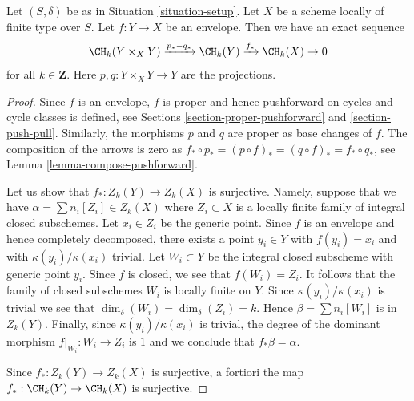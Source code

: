 %
\begin{lemma}
\label{lemma-envelope}
Let $(S, \delta)$ be as in Situation \ref{situation-setup}.
Let $X$ be a scheme locally of finite type over $S$.
Let $f : Y \to X$ be an envelope. Then
we have an exact sequence
$$
\CH_k(Y \times_X Y) \xrightarrow{p_* - q_*}
\CH_k(Y) \xrightarrow{f_*}
\CH_k(X) \to 0
$$
for all $k \in \mathbf{Z}$. Here $p, q : Y \times_X Y \to Y$ are
the projections.
\end{lemma}

\begin{proof}
Since $f$ is an envelope, $f$ is proper and hence pushforward on
cycles and cycle classes is defined, see
Sections \ref{section-proper-pushforward} and \ref{section-push-pull}.
Similarly, the morphisms $p$ and $q$ are proper as base changes of $f$.
The composition of the arrows is zero as
$f_* \circ p_* = (p \circ f)_* = (q \circ f)_* = f_* \circ q_*$, see
Lemma \ref{lemma-compose-pushforward}.

\medskip\noindent
Let us show that $f_* : Z_k(Y) \to Z_k(X)$ is surjective.
Namely, suppose that we have $\alpha = \sum n_i[Z_i] \in Z_k(X)$
where $Z_i \subset X$ is a locally finite family of integral
closed subschemes. Let $x_i \in Z_i$ be the generic point.
Since $f$ is an envelope and hence completely decomposed,
there exists a point $y_i \in Y$ with $f(y_i) = x_i$
and with $\kappa(y_i)/\kappa(x_i)$ trivial. Let $W_i \subset Y$
be the integral closed subscheme with generic point $y_i$.
Since $f$ is closed, we see that $f(W_i) = Z_i$.
It follows that the family of closed subschemes $W_i$ is locally finite
on $Y$. Since $\kappa(y_i)/\kappa(x_i)$ is trivial we see
that $\dim_\delta(W_i) = \dim_\delta(Z_i) = k$. Hence
$\beta = \sum n_i[W_i]$ is in $Z_k(Y)$. Finally, since
$\kappa(y_i)/\kappa(x_i)$ is trivial, the degree of the dominant
morphism $f|_{W_i} : W_i \to Z_i$ is $1$ and we conclude
that $f_*\beta = \alpha$.

\medskip\noindent
Since $f_* : Z_k(Y) \to Z_k(X)$ is surjective, a fortiori the map
$f_* : \CH_k(Y) \to \CH_k(X)$ is surjective.


\end{proof}
